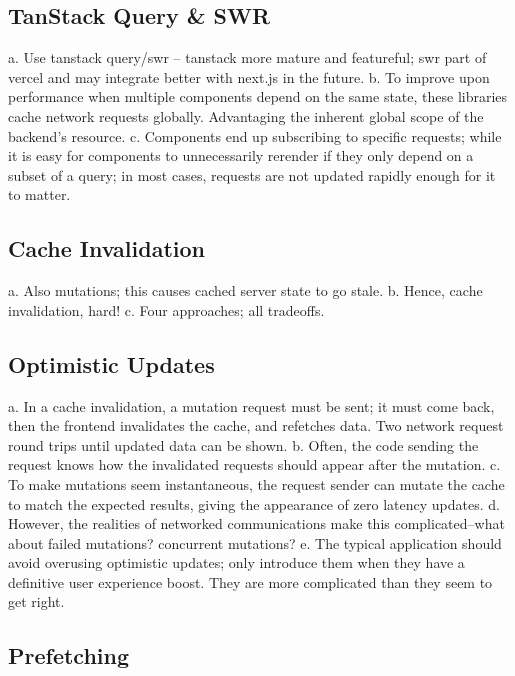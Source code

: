 \documentclass{article}
\begin{document}
\subsection{TanStack Query \& SWR}

a. Use tanstack query/swr -- tanstack more mature and featureful; swr part of vercel and may integrate better with next.js in the future.
b. To improve upon performance when multiple components depend on the same state, these libraries cache network requests globally. Advantaging the inherent global scope of the backend's resource.
c. Components end up subscribing to specific requests; while it is easy for components to unnecessarily rerender if they only depend on a subset of a query; in most cases, requests are not updated rapidly enough for it to matter.

\subsection{Cache Invalidation}

a. Also mutations; this causes cached server state to go stale.
b. Hence, cache invalidation, hard!
c. Four approaches; all tradeoffs.

\subsection{Optimistic Updates}

a. In a cache invalidation, a mutation request must be sent; it must come back, then the frontend invalidates the cache, and refetches data. Two network request round trips until updated data can be shown.
b. Often, the code sending the request knows how the invalidated requests should appear after the mutation.
c. To make mutations seem instantaneous, the request sender can mutate the cache to match the expected results, giving the appearance of zero latency updates.
d. However, the realities of networked communications make this complicated--what about failed mutations? concurrent mutations?
e. The typical application should avoid overusing optimistic updates; only introduce them when they have a definitive user experience boost. They are more complicated than they seem to get right.

\subsection{Prefetching}
\end{document}
